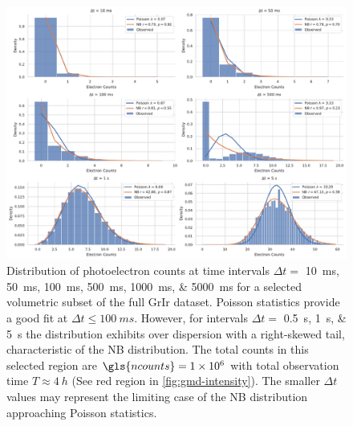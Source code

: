 \begin{figure}
    \centering
    \includegraphics[width=1\linewidth]{images/hist_counts_facetgrid_3_grir.pdf}
    \caption{Distribution of photoelectron counts at time intervals $\Delta t =$ \qtylist{10;50;100;500;1000;5000}{ms} for a selected volumetric subset of the full \gls{GrIr} dataset. Poisson statistics provide a good fit at $\Delta t \leq \qty{100}{ms}$. However, for intervals $\Delta t =$ \qtylist{0.5;1;5}{s} the distribution exhibits over dispersion with a right-skewed tail, characteristic of the \gls{NB} distribution. The total counts in this selected region are $\gls{ncounts}=\num{1e6}$ with total observation time $T\approx\qty{4}{h}$  (See red region in \cref{fig:gmd-intensity}). The smaller $\Delta t$ values may represent the limiting case of the \gls{NB} distribution approaching Poisson statistics.}
    \label{fig:grir-stats-3}
\end{figure}



   
